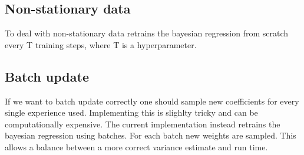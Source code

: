 \subsection{Non-stationary data}

To deal with non-stationary data \cite{azziz_2018} retrains the bayesian regression from scratch every T training steps, where T is a hyperparameter.

\subsection{Batch update}

If we want to batch update correctly one should sample new coefficients for every single experience used. Implementing this is slighlty tricky and can be computationally expensive. The current implementation instead retrains the bayesian regression using batches. For each batch new weights are sampled. This allows a balance between a more correct variance estimate and run time.


\cleardoublepage